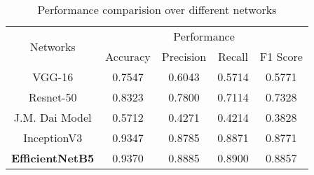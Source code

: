 \begin{table}
    \centering
    \begin{tabular}{c | c c c c}
        \hline
        \hline
        \multirow{2}{*}{Networks} & 
            \multicolumn{4}{c}{Performance}\\
            & Accuracy & Precision & Recall & F1 Score\\
        \hline
        VGG-16 & 0.7547 &  0.6043 & 0.5714 & 0.5771\\
        Resnet-50 & 0.8323 & 0.7800 & 0.7114 & 0.7328\\
        J.M. Dai Model & 0.5712 & 0.4271 & 0.4214 & 0.3828\\
        InceptionV3 & 0.9347 & 0.8785 & 0.8871 & 0.8771 \\
        \textbf{EfficientNetB5} & 0.9370 & 0.8885 & 0.8900 & 0.8857\\
        \hline
    \end{tabular}
    \caption{Performance comparision over different networks}
    \label{tab:Comparision}
\end{table}